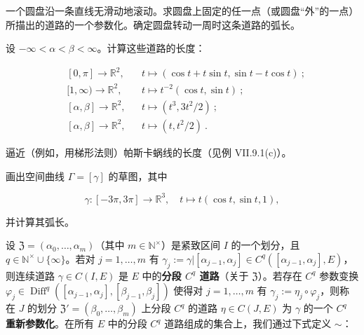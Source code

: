 \exerciseshead

\begin{exercises}
\item

一个圆盘沿一条直线无滑动地滚动。求圆盘上固定的任一点（或圆盘“外”的一点）所描出的道路的一个参数化。确定圆盘转动一周时这条道路的弧长。

\item

设 $ -\infty < \alpha < \beta < \infty $。计算这些道路的长度：

\begin{equation*}
\begin{aligned}
&[0, \pi] \to \mathbb{R}^{2}, && t \mapsto (\cos t + t\sin t, \sin t - t\cos t)\ ; \\ &[1, \infty) \to \mathbb{R}^{2}, && t \mapsto t^{-2}(\cos t, \sin t)\ ; \\ &[\alpha, \beta] \to \mathbb{R}^{2}, && t \mapsto (t^{3}, 3t^{2}/2)\ ; \\ &[\alpha, \beta] \to \mathbb{R}^{2}, && t \mapsto (t, t^{2}/2)\ .
\end{aligned}
\end{equation*}
\item

逼近（例如，用梯形法则）帕斯卡蜗线的长度（见例 VII.9.1(c)）。

\item

画出空间曲线 $ \Gamma = [\gamma] $ 的草图，其中

\[
\gamma : [-3\pi, 3\pi] \to \mathbb{R}^{3} , \quad t \mapsto t(\cos t, \sin t, 1) ,
\]

并计算其弧长。

\item

设 $ \mathfrak{Z} = (\alpha_{0}, \ldots, \alpha_{m}) $（其中 $ m \in \mathbb{N}^{\times} $）是紧致区间 $ I $ 的一个划分，且 $ q \in \mathbb{N}^{\times} \cup \{\infty\} $。若对 $ j = 1, \ldots, m $ 有 $ \gamma_{j} := \gamma|[\alpha_{j-1}, \alpha_{j}] \in C^{q}([\alpha_{j-1}, \alpha_{j}], E) $，则连续道路 $ \gamma \in C(I, E) $ 是 $ E $ 中的\textbf{分段 $ C^{q} $ 道路}（关于 $ \mathfrak{Z} $）。若存在 $ C^{q} $ 参数变换 $ \varphi_{j} \in \operatorname{Diff}^{q}([\alpha_{j-1}, \alpha_{j}], [\beta_{j-1}, \beta_{j}]) $ 使得对 $ j = 1, \ldots, m $ 有 $ \gamma_{j} := \eta_{j} \circ \varphi_{j} $，则称在 $ J $ 的划分 $ \mathfrak{Z}' = (\beta_{0}, \ldots, \beta_{m}) $ 上分段 $ C^{q} $ 的道路 $ \eta \in C(J, E) $ 为 $ \gamma $ 的一个 \textbf{$ C^{q} $ 重新参数化}。在所有 $ E $ 中的分段 $ C^{q} $ 道路组成的集合上，我们通过下式定义 $ \sim $：


\end{exercises}
